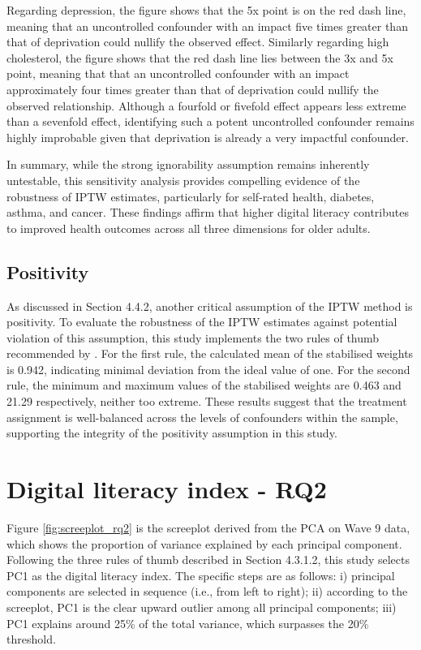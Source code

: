 Regarding depression, the figure shows that the 5x point is on the red dash line, meaning that an uncontrolled confounder with an impact five times greater than that of deprivation could nullify the observed effect. Similarly regarding high cholesterol, the figure shows that the red dash line lies between the 3x and 5x point, meaning that that an uncontrolled confounder with an impact approximately four times greater than that of deprivation could nullify the observed relationship. Although a fourfold or fivefold effect appears less extreme than a sevenfold effect, identifying such a potent uncontrolled confounder remains highly improbable given that deprivation is already a very impactful confounder. 

In summary, while the strong ignorability assumption remains inherently untestable, this sensitivity analysis provides compelling evidence of the robustness of IPTW estimates, particularly for self-rated health, diabetes, asthma, and cancer. These findings affirm that higher digital literacy contributes to improved health outcomes across all three dimensions for older adults.

\subsection{Positivity}
As discussed in Section 4.4.2, another critical assumption of the IPTW method is positivity. To evaluate the robustness of the IPTW estimates against potential violation of this assumption, this study implements the two rules of thumb recommended by \textcite{cole_constructing_2008}. For the first rule, the calculated mean of the stabilised weights is 0.942, indicating minimal deviation from the ideal value of one. For the second rule, the minimum and maximum values of the stabilised weights are 0.463 and 21.29 respectively, neither too extreme. These results suggest that the treatment assignment is well-balanced across the levels of confounders within the sample, supporting the integrity of the positivity assumption in this study.

\section{Digital literacy index - RQ2}
Figure \ref{fig:screeplot_rq2} is the screeplot derived from the PCA on Wave 9 data, which shows the proportion of variance explained by each principal component. Following the three rules of thumb \parencite[p. 212]{zelterman_applied_2015} described in Section 4.3.1.2, this study selects PC1 as the digital literacy index. The specific steps are as follows: i) principal components are selected in sequence (i.e., from left to right); ii) according to the screeplot, PC1 is the clear upward outlier among all principal components; iii) PC1 explains around 25\% of the total variance, which surpasses the 20\% threshold. 

